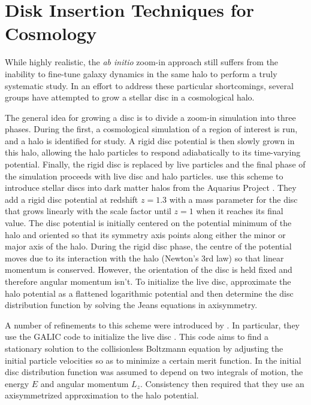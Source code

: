 \section{Disk Insertion Techniques for Cosmology}

While highly realistic, the \textit{ab initio} zoom-in approach still suffers from the inability to fine-tune galaxy dynamics in the same halo to perform a truly systematic study. In an effort to address these particular shortcomings, several groups have attempted to grow a stellar disc in a cosmological halo.  


The general idea for growing a disc is to divide a zoom-in simulation into three phases.  During the first, a cosmological simulation of a region of interest is run, and a halo is identified for study.  A rigid disc potential is then slowly grown in this halo, allowing the halo particles to respond adiabatically to its time-varying potential.  Finally, the rigid disc is replaced by live particles and the final phase of the simulation proceeds with live disc and halo particles.  \citet{debuhr_2012} use this scheme to introduce stellar discs into dark matter halos from the Aquarius Project \citep{springel2008}.  They add a rigid disc potential at redshift $z=1.3$ with a mass parameter for the disc that grows linearly with the scale factor until $z=1$ when it reaches its final value.  The disc potential is initially centered on the potential minimum of the halo and oriented so that its symmetry axis points along either the minor or major axis of the halo.  During the rigid disc phase, the centre of the potential moves due to its interaction with the halo (Newton's 3rd law) so that linear momentum is conserved.  However, the orientation of the disc is held fixed and therefore angular momentum isn't.  To initialize the live disc, \citet{debuhr_2012} approximate the halo potential as a flattened logarithmic potential and then determine the disc distribution function by solving the Jeans equations in axisymmetry. 

A number of refinements to this scheme were introduced by \citet{ys_2015}.  In particular, they use the GALIC code to initialize the live disc \citet{YurinSpringelGalic}.  This code aims to find a stationary solution to the collisionless Boltzmann equation by adjusting the initial particle velocities so as to minimize a certain merit function.  In \citet{ys_2015} the initial disc distribution function was assumed to depend on two integrals of motion, the energy $E$ and angular momentum $L_z$.  Consistency then required that they use an axisymmetrized approximation to the halo potential.

